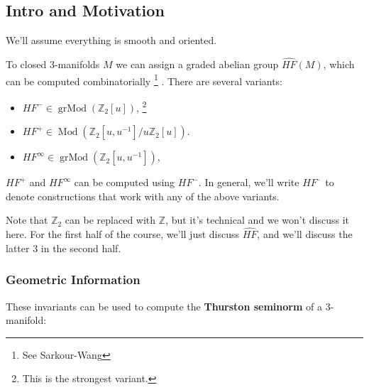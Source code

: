 
\hypertarget{intro-and-motivation}{%
\subsection{Intro and Motivation}\label{intro-and-motivation}}

We'll assume everything is smooth and oriented.

\begin{proposition}

To closed 3-manifolds \(M\) we can assign a graded abelian group
\(\widehat{HF}(M)\), which can be computed combinatorially \footnote{See
  Sarkour-Wang} . There are several variants:

\begin{itemize}
\item
  \(HF^- \in {\operatorname{grMod}}({\mathbb{Z}}_2[u])\), \footnote{This
    is the strongest variant.}
\item
  \(HF^+ \in {\operatorname{Mod}}({\mathbb{Z}}_2[u, u ^{-1} ] / u {\mathbb{Z}}_2[u])\).
\item
  \(HF^\infty \in {\operatorname{grMod}}({\mathbb{Z}}_2[u, u ^{-1} ])\),
\end{itemize}

\(HF^+\) and \(HF^\infty\) can be computed using \(HF^-\). In general,
we'll write \(HF^{\,\cdot\,}\) to denote constructions that work with
any of the above variants.

\end{proposition}

\begin{remark}

Note that \({\mathbb{Z}}_2\) can be replaced with \({\mathbb{Z}}\), but
it's technical and we won't discuss it here. For the first half of the
course, we'll just discuss \(\widehat{HF}\), and we'll discuss the
latter 3 in the second half.

\end{remark}

\hypertarget{geometric-information}{%
\subsubsection{Geometric Information}\label{geometric-information}}

These invariants can be used to compute the \textbf{Thurston seminorm}
of a 3-manifold:

